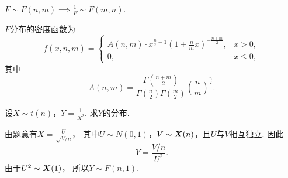 \begin{proposition}
\(F \sim F(n,m) \implies \frac{1}{F} \sim F(m,n)\).
\end{proposition}

\begin{theorem}
\(F\)分布的密度函数为\begin{equation}
	f(x,n,m) = \left\{ \begin{array}{cl}
		A(n,m) \cdot x^{\frac{n}{2}-1}
		\left(1+\frac{n}{m}x\right)^{-\frac{n+m}{2}},
		& x > 0, \\
		0, & x \leq 0,
	\end{array} \right.
\end{equation}
其中\[
	A(n,m)=\frac{
		\Gamma\left(\frac{n+m}{2}\right)
	}{
		\Gamma\left(\frac{n}{2}\right) \Gamma\left(\frac{m}{2}\right)
	}
	\left(\frac{n}{m}\right)^{\frac{n}{2}}.
\]
\end{theorem}

\begin{example}
设\(X \sim t(n)\)，\(Y=\frac{1}{X^2}\).
求\(Y\)的分布.
\begin{solution}
由题意有\(X = \frac{U}{\sqrt{V/n}}\)，
其中\(U \sim N(0,1)\)，\(V \sim \boldsymbol{X}(n)\)，且\(U\)与\(V\)相互独立.
因此\[
	Y = \frac{V/n}{U^2}.
\]
由于\(U^2 \sim \boldsymbol{X}(1)\)，
所以\(Y \sim F(n,1)\).
\end{solution}
\end{example}
